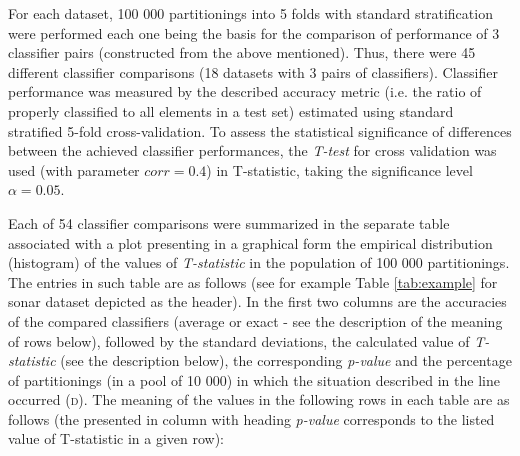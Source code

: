 \documentclass[final,3p,times,onecolumn]{elsarticle}
\begin{document}
For each dataset, 100 000 partitionings into 5 folds with standard stratification were performed each one being the basis for the comparison of performance of 3 classifier pairs (constructed from the above mentioned). Thus, there were 45 different classifier comparisons (18 datasets with 3 pairs of classifiers). Classifier performance was measured by the described accuracy metric (i.e. the ratio of properly classified to all elements in a test set) estimated using standard stratified 5-fold cross-validation. To assess the statistical significance of differences between the achieved classifier performances, the \emph{T-test} for cross validation was used (with parameter $corr=0.4$) in T-statistic, taking the significance level $\alpha=0.05$.




Each of 54 classifier comparisons were summarized in the separate table associated with a plot presenting in a graphical form the empirical distribution (histogram) of the values of \emph{T-statistic} in the population of 100 000 partitionings. The entries in such table are as follows (see for example Table \ref{tab:example} for sonar dataset depicted as the header). In the first two columns are the accuracies of the compared classifiers (average or exact - see the description of the meaning of rows below), followed by the standard deviations, the calculated value of \emph{T-statistic} (see the description below), the corresponding \emph{p-value} and the percentage of partitionings (in a pool of 10 000) in which the situation described in the line occurred (\textsc{d}). The meaning of the values in the following rows in each table are as follows (the presented in column with heading \emph{p-value} corresponds to the listed value of T-statistic in a given row):
\end{document}
